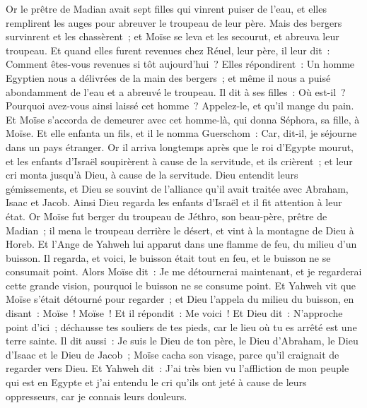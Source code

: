 \begin{multicols}{2}
Or le prêtre de Madian avait sept filles qui vinrent puiser de l'eau, et elles remplirent les auges pour abreuver le troupeau de leur père.
Mais des bergers survinrent et les chassèrent~; et Moïse se leva et les secourut, et abreuva leur troupeau.
Et quand elles furent revenues chez Réuel, leur père, il leur dit~: Comment êtes-vous revenues si tôt aujourd'hui~?
Elles répondirent~: Un homme Egyptien nous a délivrées de la main des bergers~; et même il nous a puisé abondamment de l'eau et a abreuvé le troupeau.
Il dit à ses filles~: Où est-il~? Pourquoi avez-vous ainsi laissé cet homme~? Appelez-le, et qu'il mange du pain.
Et Moïse s'accorda de demeurer avec cet homme-là, qui donna Séphora, sa fille, à Moïse.
Et elle enfanta un fils, et il le nomma Guerschom~: Car, dit-il, je séjourne dans un pays étranger.
Or il arriva longtemps après que le roi d'Egypte mourut, et les enfants d'Israël soupirèrent à cause de la servitude, et ils crièrent~; et leur cri monta jusqu'à Dieu, à cause de la servitude.
Dieu entendit leurs gémissements, et Dieu se souvint de l'alliance qu'il avait traitée avec Abraham, Isaac et Jacob.
Ainsi Dieu regarda les enfants d'Israël et il fit attention à leur état.
\VerseOne{}Or Moïse fut berger du troupeau de Jéthro, son beau-père, prêtre de Madian~; il mena le troupeau derrière le désert, et vint à la montagne de Dieu à Horeb.
Et l'Ange de Yahweh lui apparut dans une flamme de feu, du milieu d'un buisson. Il regarda, et voici, le buisson était tout en feu, et le buisson ne se consumait point.
Alors Moïse dit~: Je me détournerai maintenant, et je regarderai cette grande vision, pourquoi le buisson ne se consume point.
Et Yahweh vit que Moïse s'était détourné pour regarder~; et Dieu l'appela du milieu du buisson, en disant~: Moïse~! Moïse~! Et il répondit~: Me voici~!
Et Dieu dit~: N'approche point d'ici~; déchausse tes souliers de tes pieds, car le lieu où tu es arrêté est une terre sainte.
Il dit aussi~: Je suis le Dieu de ton père, le Dieu d'Abraham, le Dieu d'Isaac et le Dieu de Jacob~; Moïse cacha son visage, parce qu'il craignait de regarder vers Dieu.
 Et Yahweh dit~: J'ai très bien vu l'affliction de mon peuple qui est en Egypte et j'ai entendu le cri qu'ils ont jeté à cause de leurs oppresseurs, car je connais leurs douleurs.

\end{multicols}
